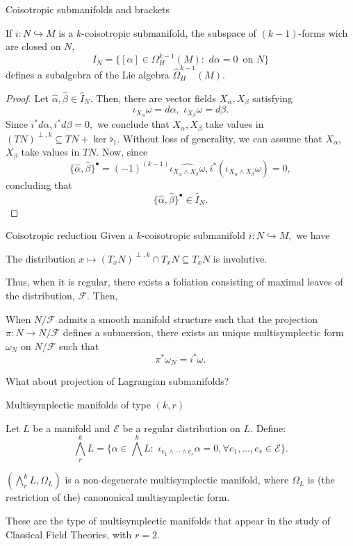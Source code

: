 \begin{frame}{Coisotropic submanifolds and brackets}
\begin{proposition} If $i: N \hookrightarrow M$ is a $k$-coisotropic submanifold, the subspace of $(k-1)$-forms wich are closed on $N$, $$I_N = \{ [\alpha] \in \Omega^{k-1}_H(M): \,\, d \alpha = 0\, \text{ on } N\}$$ defines a subalgebra of the Lie algebra $\widehat \Omega_H^{k-1}(M).$
\end{proposition}
\pause
\begin{proof}
Let $\widehat{\alpha}, \widehat{\beta} \in \widehat{I}_N.$ Then, there are vector fields $X_\alpha, X_\beta$ satisfying $$\iota_{X_\alpha} \omega = d \alpha, \,\, \iota_{X_\beta} \omega = d \beta.$$ Since $i^\ast d\alpha, i^\ast d\beta = 0,$ we conclude that $X_\alpha, X_\beta$ take values in $(TN)^{\perp, k} \subseteq TN + \ker \flat_1.$ Without loss of generality, we can assume that $X_\alpha$, $X_\beta$ take values in $TN$. Now, since $$\{\widehat{\alpha}, \widehat{\beta}\}^\bullet =  (-1)^{(k-1)} \widehat{ \iota_{X_\alpha \wedge X_\beta} \omega},  i^\ast \left(\iota_{X_\alpha \wedge X_\beta} \omega\right) = 0,$$ concluding that $$\{\widehat{\alpha}, \widehat{\beta}\}^\bullet \in \widehat{I}_N.$$
\end{proof}
\end{frame}

\begin{frame}{Coisotropic reduction}
    Given a $k$-coisotropic submanifold $i: N \hookrightarrow M,$ we have
\begin{proposition} The distribution $x \mapsto (T_x N)^{\perp, k} \cap T_xN \subseteq T_xN$ is involutive.
\end{proposition}
Thus, when it is regular, there exists a foliation consisting of maximal leaves of the distribution, $\mathcal{F}.$ \pause Then,
\begin{theorem} When $N/\mathcal{F}$ admits a smooth manifold structure such that the projection $\pi: N \rightarrow N/\mathcal{F}$ defines a submersion, there exists an unique multisymplectic form $\omega_N$ on $N/\mathcal{F}$ such that $$\pi^\ast \omega_N = i^\ast\omega.$$
\end{theorem}
\alert{What about projection of Lagrangian submanifolds?}
\end{frame}


\begin{frame}{Multisymplectic manifolds of type $(k,r)$} 
\begin{definition}
    Let $L$ be a manifold and $\mathcal{E}$ be a regular distribution on $L$. Define:
$$\bigwedge^k_r L = \{ \alpha \in \bigwedge^k L: \,\, \iota_{e_1 \wedge \cdots \wedge e_r} \alpha = 0, \forall e_1, \dots, e_r \in \mathcal{E}\}.$$
\end{definition}
\pause
\begin{proposition} $(\bigwedge^k_r L, \Omega_L)$ is a non-degenerate multisymplectic manifold, where $\Omega_L$ is (the restriction of the) canononical multisymplectic form.
\end{proposition}
These are the type of multisymplectic manifolds that appear in the study of Classical Field Theories, with $r= 2.$
\end{frame}

